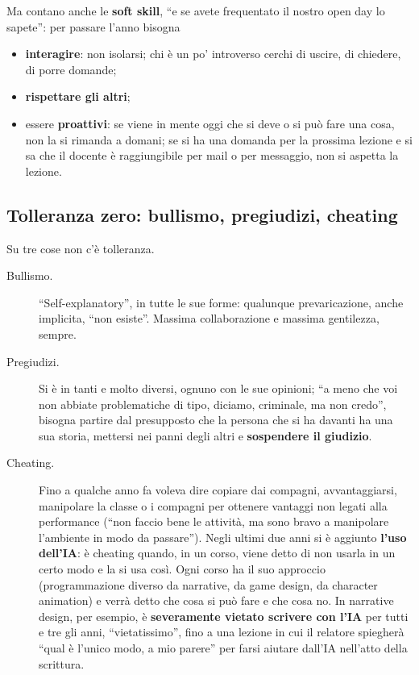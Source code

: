 Ma contano anche le \textbf{soft skill}, ``e se avete frequentato il nostro
open day lo sapete'': per passare l'anno bisogna
\begin{itemize}
  \item \textbf{interagire}: non isolarsi; chi è un po' introverso cerchi di
        uscire, di chiedere, di porre domande;
  \item \textbf{rispettare gli altri};
  \item essere \textbf{proattivi}: se viene in mente oggi che si deve o si
        può fare una cosa, non la si rimanda a domani; se si ha una domanda
        per la prossima lezione e si sa che il docente è raggiungibile per
        mail o per messaggio, non si aspetta la lezione.
\end{itemize}

\subsection{Tolleranza zero: bullismo, pregiudizi, cheating}

Su tre cose non c'è tolleranza.
\begin{description}
  \item[Bullismo.] ``Self-explanatory'', in tutte le sue forme: qualunque
        prevaricazione, anche implicita, ``non esiste''. Massima
        collaborazione e massima gentilezza, sempre.
  \item[Pregiudizi.] Si è in tanti e molto diversi, ognuno con le sue
        opinioni; ``a meno che voi non abbiate problematiche di tipo,
        diciamo, criminale, ma non credo'', bisogna partire dal presupposto
        che la persona che si ha davanti ha una sua storia, mettersi nei
        panni degli altri e \textbf{sospendere il giudizio}.
  \item[Cheating.] Fino a qualche anno fa voleva dire copiare dai compagni,
        avvantaggiarsi, manipolare la classe o i compagni per ottenere
        vantaggi non legati alla performance (``non faccio bene le attività,
        ma sono bravo a manipolare l'ambiente in modo da passare''). Negli
        ultimi due anni si è aggiunto \textbf{l'uso dell'IA}: è cheating
        quando, in un corso, viene detto di non usarla in un certo modo e la
        si usa così. Ogni corso ha il suo approccio (programmazione diverso
        da narrative, da game design, da character animation) e verrà detto
        che cosa si può fare e che cosa no. In narrative design, per
        esempio, è \textbf{severamente vietato scrivere con l'IA} per tutti
        e tre gli anni, ``vietatissimo'', fino a una lezione in cui il
        relatore spiegherà ``qual è l'unico modo, a mio parere'' per farsi
        aiutare dall'IA nell'atto della scrittura.
\end{description}

